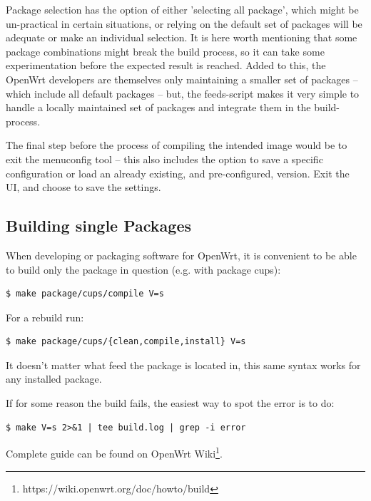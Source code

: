 Package selection has the option of either 'selecting all package', which might be un-practical in certain situations, or relying on the default set of packages will be adequate or make an individual selection.
It is here worth mentioning that some package combinations might break the build process, so it can take some experimentation before the expected result is reached.
Added to this, the OpenWrt developers are themselves only maintaining a smaller set of packages – which include all default packages – but, the feeds-script makes it very simple to handle a locally maintained set of packages and integrate them in the build-process.

The final step before the process of compiling the intended image would be to exit the menuconfig tool – this also includes the option to save a specific configuration or load an already existing, and pre-configured, version.
Exit the UI, and choose to save the settings\cite{build_owrt}.



\subsection{Building single Packages}

When developing or packaging software for OpenWrt, it is convenient to be able to build only the package in question (e.g. with package cups):
\begin{lstlisting}[columns=fixed,basicstyle=\ttfamily\footnotesize,tabsize=4,backgroundcolor=\color{yellow!10}]
$ make package/cups/compile V=s
\end{lstlisting}
For a rebuild run:
\begin{lstlisting}[columns=fixed,basicstyle=\ttfamily\footnotesize,tabsize=4,backgroundcolor=\color{yellow!10}]
$ make package/cups/{clean,compile,install} V=s
\end{lstlisting}
It doesn't matter what feed the package is located in, this same syntax works for any installed package. %

If for some reason the build fails, the easiest way to spot the error is to do:
\begin{lstlisting}[columns=fixed,basicstyle=\ttfamily\footnotesize,tabsize=4,backgroundcolor=\color{yellow!10}]
$ make V=s 2>&1 | tee build.log | grep -i error
\end{lstlisting}
Complete guide can be found on OpenWrt Wiki\footnote{https://wiki.openwrt.org/doc/howto/build}.

